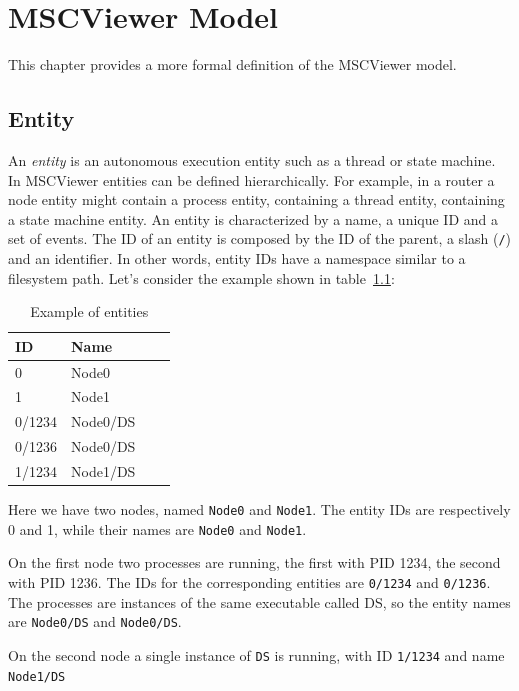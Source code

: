 \documentclass[11pt, twoside, titlepage]{book}
\newcommand{\prog}{MSCViewer}
\newcommand{\defterm}[1]{\textit{#1}\index{#1}}
\begin{document}
\chapter{\prog{} Model}
This chapter provides a more formal definition of the \prog{} model. 

\section {Entity}
An \defterm{entity} is an autonomous execution entity such as a thread or state
machine. In MSCViewer entities can be defined hierarchically. For example, in a
router a node entity might contain a process entity, containing  a thread
entity, containing a state machine entity. An entity is characterized by a name,
a unique ID and a set of events. The ID of an entity is composed by the ID of
the parent, a slash (\texttt{/}) and an identifier. In other words, entity IDs
have a namespace similar to a filesystem path.
Let's consider the example shown in table~\ref{tab:entities}:
 
\begin{center}
    \begin{table}[h]
    \centering
    \label{tab:entities}
    \begin{tabular}{ | l | l | l | l |}
    \hline
    ID & Name\\ 
    \hline
    0       & Node0 \\  
    1       & Node1 \\  
    0/1234  & Node0/DS \\
    0/1236  & Node0/DS \\
    1/1234  & Node1/DS \\
    \hline
    \end{tabular}
    \caption{Example of entities}
    \end{table}
\end{center}

Here we have two nodes, named \texttt{Node0} and \texttt{Node1}. The entity IDs
are respectively 0 and 1, while their names are \texttt{Node0} and
\texttt{Node1}. 

On the first node two processes are running, the first with PID
1234, the second with PID 1236. The IDs for the corresponding entities are
\texttt{0/1234} and \texttt{0/1236}. The processes are instances of the same
executable called DS, so the entity names are \texttt{Node0/DS} and
\texttt{Node0/DS}. 

On the second node a single instance of \texttt{DS} is running, with ID
\texttt{1/1234} and name \texttt{Node1/DS}
\end{document}
